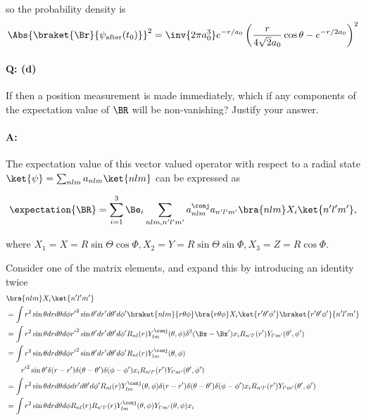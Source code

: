 {so the probability density is
\begin{equation}\label{eqn:qmIexamPractice2007Dec:4:300}
\Abs{\braket{\Br}{\psi_{\text{after}}(t_0)}}^2
= \inv{2 \pi a_0^3}
e^{-r/a_0}
\left(
\frac{r}{4\sqrt{2} a_0} \cos\theta
-e^{-r/2 a_0}
\right)^2
\end{equation}

\paragraph{Q: (d)}

If then a position measurement is made immediately, which if any components of the expectation value of \(\BR\) will be non-vanishing?  Justify your answer.

\paragraph{A:}

The expectation value of this vector valued operator with respect to a radial state \(\ket{\psi} = \sum_{nlm} a_{nlm} \ket{nlm}\) can be expressed as

\begin{equation}\label{eqn:qmIexamPractice2007Dec:4:400}
\expectation{\BR} = \sum_{i=1}^3 \Be_i \sum_{nlm, n'l'm'}
a_{nlm}^\conj a_{n'l'm'}
\bra{nlm} X_i
\ket{n'l'm'},
\end{equation}

where \(X_1 = X = R \sin\Theta \cos\Phi, X_2 = Y = R \sin\Theta \sin\Phi, X_3 = Z = R \cos\Phi\).

Consider one of the matrix elements, and expand this by introducing an identity twice
\begin{equation}\label{eqn:qmIexamPractice2007Dec:550}
\begin{aligned}
&\bra{nlm} X_i \ket{n'l'm'} \\
&=
\int
r^2 \sin\theta dr d\theta d\phi
{r'}^2 \sin\theta' dr' d\theta' d\phi'
\braket{nlm}{r \theta \phi} \bra{r \theta \phi} X_i \ket{r' \theta' \phi' }\braket{r' \theta' \phi'}{n'l'm'} \\
&=
\int
r^2 \sin\theta dr d\theta d\phi
{r'}^2 \sin\theta' dr' d\theta' d\phi'
R_{nl}(r) Y_{lm}^\conj(\theta,\phi)
\delta^3(\Bx - \Bx') x_i
R_{n'l'}(r') Y_{l'm'}(\theta',\phi')
\\
&=
\int
r^2 \sin\theta dr d\theta d\phi
{r'}^2 \sin\theta' dr' d\theta' d\phi'
R_{nl}(r) Y_{lm}^\conj(\theta,\phi) \\
&\qquad{r'}^2 \sin\theta' \delta(r-r') \delta(\theta - \theta') \delta(\phi-\phi')
x_i
R_{n'l'}(r') Y_{l'm'}(\theta',\phi')
\\
&=
\int
r^2 \sin\theta dr d\theta d\phi
dr' d\theta' d\phi'
R_{nl}(r) Y_{lm}^\conj(\theta,\phi)
\delta(r-r') \delta(\theta - \theta') \delta(\phi-\phi')
x_i
R_{n'l'}(r') Y_{l'm'}(\theta',\phi')
\\
&=
\int
r^2 \sin\theta dr d\theta d\phi
R_{nl}(r) R_{n'l'}(r)
Y_{lm}^\conj(\theta,\phi) Y_{l'm'}(\theta,\phi)
x_i
\\
\end{aligned}
\end{equation}

}
